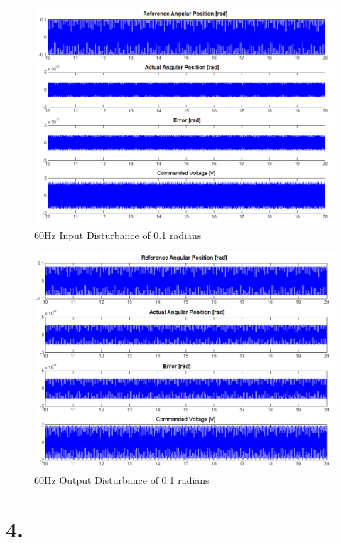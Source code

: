 \documentclass{article}
\theoremstyle{plain}
\theoremstyle{definition}
\theoremstyle{remark}
\begin{document}
\begin{figure}[htb]
\begin{center}
\includegraphics[width = 13 cm]{q3_20}
\caption{60Hz Input Disturbance of 0.1 radians}
\label{q3_18}
\end{center}
\end{figure}

\begin{figure}[htb]
\begin{center}
\includegraphics[width = 13 cm]{q3_21}
\caption{60Hz Output Disturbance of 0.1 radians}
\label{q3_21}
\end{center}
\end{figure}

\clearpage

\section*{4.}
\end{document}
